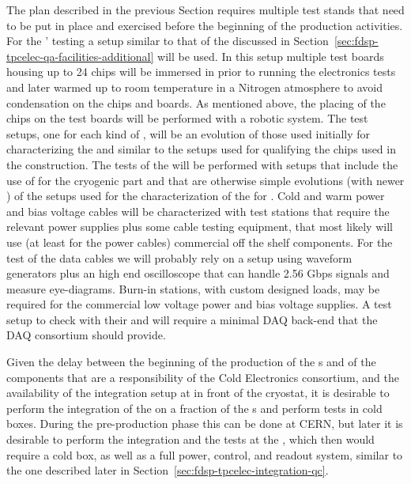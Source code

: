 The  plan described in the previous Section requires
multiple test stands that need to be put in place and exercised 
before the beginning of the production activities. For the '
testing a setup similar to that of the  discussed in
Section~\ref{sec:fdsp-tpcelec-qa-facilities-additional} will
be used. In this setup multiple test boards housing up to 24
chips will be immersed in \lntwo prior to running the
electronics tests and later warmed up to room temperature in 
a Nitrogen atmosphere to avoid condensation on the chips and
boards. As mentioned above, the placing of the chips on the test 
boards will be performed with a robotic system. The test setups,
one for each kind of , will be an evolution of those
used initially for characterizing the  and similar
to the setups used for qualifying the chips used in the 
construction. The tests of the  will be performed with
setups that include the use of  for the cryogenic part
and that are otherwise simple evolutions (with newer )
of the setups used for the characterization of the 
for . Cold and warm power and bias voltage cables will
be characterized with test stations that require the relevant 
power supplies plus some cable testing equipment, that most likely will
use (at least for the power cables) commercial off the shelf components.
For the test of the data cables we will probably rely on a setup
using waveform generators plus an high end oscilloscope that 
can handle 2.56 Gbps signals and measure eye-diagrams. 
Burn-in stations, with custom designed loads, may be required for 
the commercial low voltage power and bias voltage supplies.
A test setup to check  with their 
and  will require a minimal DAQ back-end that the
DAQ consortium should provide.

Given the delay between the beginning of the production of the
s and of the components that are a responsibility of
the Cold  Electronics consortium, and the availability of the
integration setup at \surf in front of the cryostat, it is
desirable to  perform the integration of the 
on a fraction of the s and perform tests in cold
boxes. During the pre-production phase this can be done at CERN,
but later it is desirable to perform the integration and the
tests at the , which then would require a cold box,
as well as a full power, control, and readout system, similar
to the one described later in Section~\ref{sec:fdsp-tpcelec-integration-qc}.
